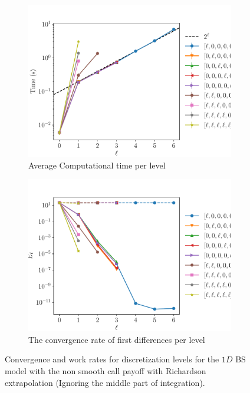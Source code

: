 \documentclass[11pt]{article}
\begin{document}
\begin{figure}[!h]
	\centering
	\begin{subfigure}{.5\textwidth}
		\centering
		\includegraphics[width=0.95\linewidth]{./figures/1D_BS_4_8_step_non_smooth_richardson_without_middle/level_work.pdf}
		\caption{Average Computational time per level}
		\label{fig:misc_1D_BS_4_8_step_non_smooth_richardson_without_middle_sub3}
	\end{subfigure}%
	\begin{subfigure}{.5\textwidth}
		\centering
		\includegraphics[width=0.95\linewidth]{./figures/1D_BS_4_8_step_non_smooth_richardson_without_middle/levels_error_rate.pdf}
		\caption{ The convergence rate of first differences per level}
		\label{fig:misc_1D_BS_4_8_step_non_smooth_richardson_without_middle_sub4}
	\end{subfigure}%
	\caption{Convergence and work rates for discretization levels for the $1D$ BS model with the non smooth call payoff with Richardson extrapolation (Ignoring the middle part of integration).}
	\label{fig:misc_1D_BS_4_8_step_non_smooth_richardson_without_middle_2}
\end{figure}
\newpage
\end{document}
